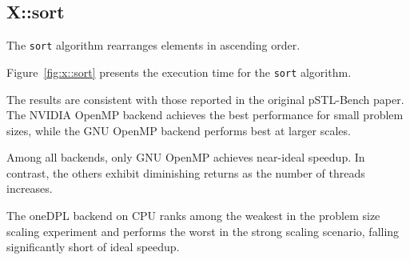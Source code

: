 \documentclass[sigconf]{acmart}
\begin{document}
\subsection{X::sort}
The \texttt{sort} algorithm rearranges elements in ascending order.

Figure~\ref{fig:x::sort} presents the execution time for the \texttt{sort}
algorithm.

The results are consistent with those reported in the original pSTL-Bench
paper. The NVIDIA OpenMP backend achieves the best performance for small
problem sizes, while the GNU OpenMP backend performs best at larger scales.

Among all backends, only GNU OpenMP achieves near-ideal speedup. In contrast,
the others exhibit diminishing returns as the number of threads increases.

The oneDPL backend on CPU ranks among the weakest in the problem size scaling
experiment and performs the worst in the strong scaling scenario, falling
significantly short of ideal speedup.
\end{document}
